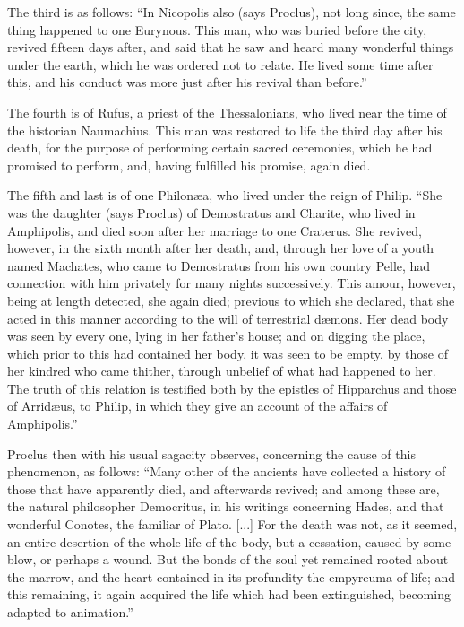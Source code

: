\documentclass[12pt]{article}
\begin{document}
{The third is as follows: ``In Nicopolis also (says Proclus), not long since,
the same thing happened to one Eurynous. This man, who was buried before the
city, revived fifteen days after, and said that he saw and heard many wonderful
things under the earth, which he was ordered not to relate. He lived some time
after this, and his conduct was more just after his revival than before.''

The fourth is of Rufus, a priest of the Thessalonians, who lived near the time
of the historian Naumachius. This man was restored to life the third day after
his death, for the purpose of performing certain sacred ceremonies, which he
had promised to perform, and, having fulfilled his promise, again died.

The fifth and last is of one Philon{\ae}a, who lived under the reign of Philip.
``She was the daughter (says Proclus) of Demostratus and Charite, who lived in
Amphipolis, and died soon after her marriage to one Craterus. She revived,
however, in the sixth month after her death, and, through her love of a youth
named Machates, who came to Demostratus from his own country Pelle, had
connection with him privately for many nights successively. This amour,
however, being at length detected, she again died; previous to which she
declared, that she acted in this manner according to the will of terrestrial
d{\ae}mons. Her dead body was seen by every one, lying in her father's house;
and on digging the place, which prior to this had contained her body, it was
seen to be empty, by those of her kindred who came thither, through unbelief of
what had happened to her. The truth of this relation is testified both by the
epistles of Hipparchus and those of Arrid{\ae}us, to Philip, in which they give
an account of the affairs of Amphipolis.''

Proclus then with his usual sagacity observes, concerning the cause of this
phenomenon, as follows: ``Many other of the ancients have collected a history
of those that have apparently died, and afterwards revived; and among these
are, the natural philosopher Democritus, in his writings concerning Hades, and
that wonderful Conotes, the familiar of Plato. [...]{\footnotemark} For the
death was not, as it seemed, an entire desertion of the whole life of the body,
but a cessation, caused by some blow, or perhaps a wound. But the bonds of the
soul yet remained rooted about the marrow, and the heart contained in its
profundity the empyreuma of life; and this remaining, it again acquired the
life which had been extinguished, becoming adapted to animation.''

}
\end{document}
